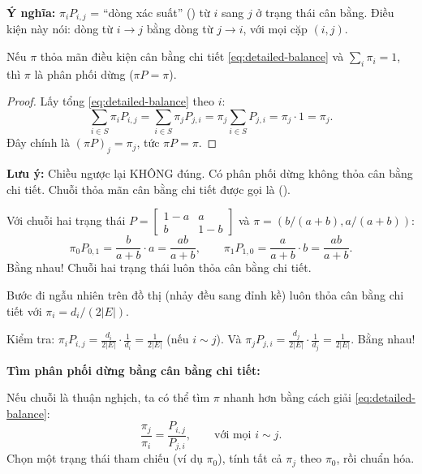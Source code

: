 \textbf{Ý nghĩa:} $\pi_i P_{i,j}$ = ``dòng xác suất'' () từ $i$ sang $j$ ở trạng thái cân bằng.
Điều kiện này nói: dòng từ $i \to j$ bằng dòng từ $j \to i$, với mọi cặp $(i, j)$.

\begin{proposition}
\label{prop:db-implies-stationary}
Nếu $\pi$ thỏa mãn điều kiện cân bằng chi tiết \eqref{eq:detailed-balance} và $\sum_i \pi_i = 1$,
thì $\pi$ là phân phối dừng ($\pi P = \pi$).
\end{proposition}

\begin{proof}
Lấy tổng \eqref{eq:detailed-balance} theo $i$:
\[
  \sum_{i \in S} \pi_i P_{i,j} = \sum_{i \in S} \pi_j P_{j,i} = \pi_j \sum_{i \in S} P_{j,i} = \pi_j \cdot 1 = \pi_j.
\]
Đây chính là $(\pi P)_j = \pi_j$, tức $\pi P = \pi$.
\end{proof}

\textbf{Lưu ý:} Chiều ngược lại KHÔNG đúng. Có phân phối dừng không thỏa cân bằng chi tiết.
Chuỗi thỏa mãn cân bằng chi tiết được gọi là  ().

\begin{example}
Với chuỗi hai trạng thái $P = \begin{bmatrix} 1-a & a \\ b & 1-b \end{bmatrix}$ và $\pi = (b/(a+b), a/(a+b))$:
\[
  \pi_0 P_{0,1} = \frac{b}{a+b} \cdot a = \frac{ab}{a+b}, \qquad
  \pi_1 P_{1,0} = \frac{a}{a+b} \cdot b = \frac{ab}{a+b}.
\]
Bằng nhau! Chuỗi hai trạng thái luôn thỏa cân bằng chi tiết.
\end{example}

\begin{example}
\label{ex:rw-graph-reversible}
Bước đi ngẫu nhiên trên đồ thị (nhảy đều sang đỉnh kề) luôn thỏa cân bằng chi tiết với $\pi_i = d_i/(2|E|)$.

Kiểm tra: $\pi_i P_{i,j} = \frac{d_i}{2|E|} \cdot \frac{1}{d_i} = \frac{1}{2|E|}$ (nếu $i \sim j$).
Và $\pi_j P_{j,i} = \frac{d_j}{2|E|} \cdot \frac{1}{d_j} = \frac{1}{2|E|}$. Bằng nhau!
\end{example}

\begin{congthuc}
\textbf{Tìm phân phối dừng bằng cân bằng chi tiết:}

Nếu chuỗi là thuận nghịch, ta có thể tìm $\pi$ nhanh hơn bằng cách giải \eqref{eq:detailed-balance}:
\[
  \frac{\pi_j}{\pi_i} = \frac{P_{i,j}}{P_{j,i}}, \qquad \text{với mọi } i \sim j.
\]
Chọn một trạng thái tham chiếu (ví dụ $\pi_0$), tính tất cả $\pi_j$ theo $\pi_0$, rồi chuẩn hóa.
\end{congthuc}


